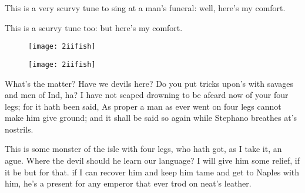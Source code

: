 \begin{prose_speech}[Stephano] 
\begin{song}
\end{song}
This is a very scurvy tune to sing at a man's funeral: well, here's my comfort. 


\begin{song}
\end{song}

This is a scurvy tune too: but here's my comfort.
\end{prose_speech}

\begin{letter}
	\begin{figure}[tb]
		\centering
		\texttt{[image: 2iifish]}
	\end{figure}
\end{letter}

\begin{a4}
	\begin{figure}[tb]
		\centering
		\texttt{[image: 2iifish]}
	\end{figure}
\end{a4}

	
\begin{prose_speech}[Stephano] What's the matter? Have we devils here? Do you put tricks upon's with savages and men of Ind, ha? I have not scaped drowning to be afeard now of your four legs; for it hath been said, As proper a man as ever went on four legs cannot make him give ground; and it shall be said so again while Stephano breathes at's nostrils.
\end{prose_speech}



\begin{prose_speech}[Stephano] 
This is some monster of the isle with four legs, who hath got, as I take it, an ague. Where the devil should he learn our language? I will give him some relief, if it be but for that. if I can recover him and keep him tame and get to Naples with him, he's a present for any emperor that ever trod on neat's leather.
\end{prose_speech}


